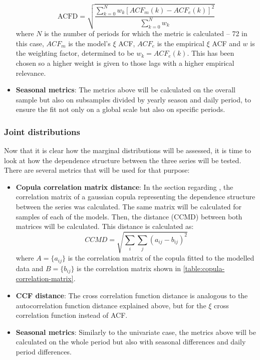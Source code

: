 \begin{itemize}
    \begin{equation}
        \text{ACFD}=\sqrt{\frac{\sum_{k=0}^N w_k\left[ACF_m\left(k\right)-ACF_e\left(k\right)\right]^2}{\sum_{k=0}^N w_k}}
    \end{equation}
    where $N$ is the number of periods for which the metric is calculated -- 72 in this case, $ACF_m$ is the model's $\xi$ ACF, $ACF_e$ is the empirical $\xi$ ACF and $w$ is the weighting factor, determined to be $w_k=ACF_e\left(k\right)$. This has been chosen so a higher weight is given to those lags with a higher empirical relevance. 
    \item \textbf{Seasonal metrics}: The metrics above will be calculated on the overall sample but also on subsamples divided by yearly season and daily period, to ensure the fit not only on a global scale but also on specific periods. 
\end{itemize}
\subsubsection{Joint distributions}
Now that it is clear how the marginal distributions will be assessed, it is time to look at how the dependence structure between the three series will be tested. There are several metrics that will be used for that purpose:
\begin{itemize}
    \item \textbf{Copula correlation matrix distance}: In the section regarding , the correlation matrix of a gaussian copula representing the dependence structure between the series was calculated. The same matrix will be calculated for samples of each of the models. Then, the distance (CCMD) between both matrices will be calculated. This distance is calculated as:
    \begin{equation}
        CCMD=\sqrt{\sum_i\sum_j\left(a_{ij}-b_{ij}\right)^2}
    \end{equation}
    where $A=\{a_{ij}\}$ is the correlation matrix of the copula fitted to the modelled data and $B=\{b_{ij}\}$ is the correlation matrix shown in \autoref{table:copula-correlation-matrix}.
    \item \textbf{CCF distance}: The cross correlation function distance is analogous to the autocorrelation function distance explained above, but for the $\xi$ cross correlation function instead of ACF.
    \item \textbf{Seasonal metrics}: Similarly to the univariate case, the metrics above will be calculated on the whole period but also with seasonal differences and daily period differences.
\end{itemize}

